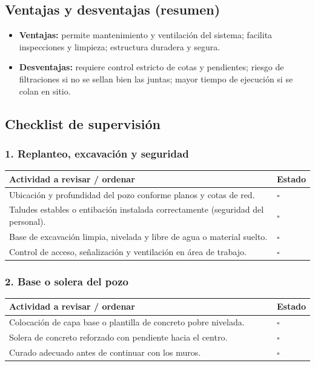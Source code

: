 \documentclass[12pt]{article}
\newcommand{\cbox}{\(\square\)}
\renewcommand{\cbox}{\(\square\)} %
\begin{document}
	\subsection*{Ventajas y desventajas (resumen)}
	\begin{itemize}[leftmargin=*, itemsep=2pt]
		\item \textbf{Ventajas:} permite mantenimiento y ventilación del sistema; facilita inspecciones y limpieza; estructura duradera y segura.
		\item \textbf{Desventajas:} requiere control estricto de cotas y pendientes; riesgo de filtraciones si no se sellan bien las juntas; mayor tiempo de ejecución si se colan en sitio.
	\end{itemize}
	
	\subsection{Checklist de supervisión}
	
	\subsubsection*{1. Replanteo, excavación y seguridad}
	\begin{tabularx}{\linewidth}{>{\raggedright\arraybackslash}p{0.93\linewidth} >{\centering\arraybackslash}m{0.07\linewidth}}
		\toprule
		\textbf{Actividad a revisar / ordenar} & \textbf{Estado}\\
		\midrule
		Ubicación y profundidad del pozo conforme planos y cotas de red. & \cbox \\
		Taludes estables o entibación instalada correctamente (seguridad del personal). & \cbox \\
		Base de excavación limpia, nivelada y libre de agua o material suelto. & \cbox \\
		Control de acceso, señalización y ventilación en área de trabajo. & \cbox \\
		\bottomrule
	\end{tabularx}
	
	\subsubsection*{2. Base o solera del pozo}
	\begin{tabularx}{\linewidth}{>{\raggedright\arraybackslash}p{0.93\linewidth} >{\centering\arraybackslash}m{0.07\linewidth}}
		\toprule
		\textbf{Actividad a revisar / ordenar} & \textbf{Estado}\\
		\midrule
		Colocación de capa base o plantilla de concreto pobre nivelada. & \cbox \\
		Solera de concreto reforzado con pendiente hacia el centro. & \cbox \\
		Curado adecuado antes de continuar con los muros. & \cbox \\
		\bottomrule
	\end{tabularx}
	
\end{document}
